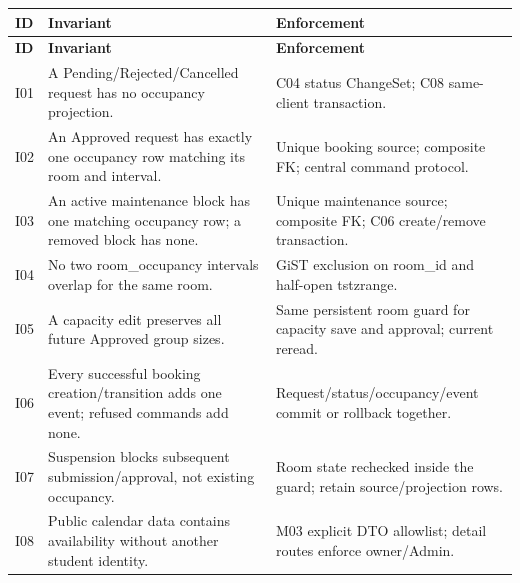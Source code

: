 \begin{longtable}{|p{}|p{}|p{}|}

\hline

\textbf{ID} & \textbf{Invariant} & \textbf{Enforcement} \\ \hline

\endfirsthead

\hline

\textbf{ID} & \textbf{Invariant} & \textbf{Enforcement} \\ \hline

\endhead

I01 & A Pending/\allowbreak{}Rejected/\allowbreak{}Cancelled request has no occupancy projection.\allowbreak{} & C04 status Change\allowbreak{}Set; C08 same-\allowbreak{}client transaction.\allowbreak{} \\ \hline

I02 & An Approved request has exactly one occupancy row matching its room and interval.\allowbreak{} & Unique booking source; composite FK; central command protocol.\allowbreak{} \\ \hline

I03 & An active maintenance block has one matching occupancy row; a removed block has none.\allowbreak{} & Unique maintenance source; composite FK; C06 create/\allowbreak{}remove transaction.\allowbreak{} \\ \hline

I04 & No two room\_\allowbreak{}occupancy intervals overlap for the same room.\allowbreak{} & Gi\allowbreak{}ST exclusion on room\_\allowbreak{}id and half-\allowbreak{}open tstzrange.\allowbreak{} \\ \hline

I05 & A capacity edit preserves all future Approved group sizes.\allowbreak{} & Same persistent room guard for capacity save and approval; current reread.\allowbreak{} \\ \hline

I06 & Every successful booking creation/\allowbreak{}transition adds one event; refused commands add none.\allowbreak{} & Request/\allowbreak{}status/\allowbreak{}occupancy/\allowbreak{}event commit or rollback together.\allowbreak{} \\ \hline

I07 & Suspension blocks subsequent submission/\allowbreak{}approval, not existing occupancy.\allowbreak{} & Room state rechecked inside the guard; retain source/\allowbreak{}projection rows.\allowbreak{} \\ \hline

I08 & Public calendar data contains availability without another student identity.\allowbreak{} & M03 explicit DTO allowlist; detail routes enforce owner/\allowbreak{}Admin.\allowbreak{} \\ \hline

\end{longtable}

